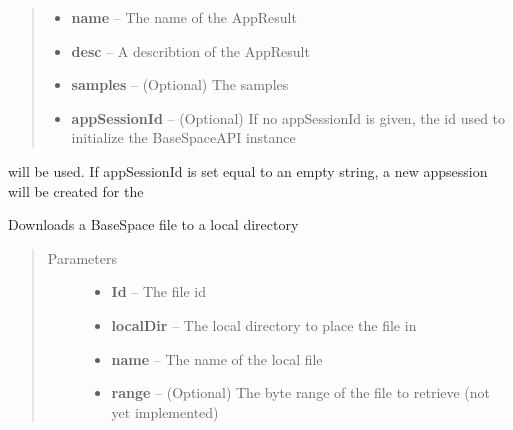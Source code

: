 \documentclass[letterpaper,10pt,english]{sphinxmanual}
\begin{document}
\begin{fulllineitems}
\begin{fulllineitems}
\begin{quote}
\begin{description}
\begin{itemize}
\item {} 
\textbf{name} -- The name of the AppResult

\item {} 
\textbf{desc} -- A describtion of the AppResult

\item {} 
\textbf{samples} -- (Optional) The samples

\item {} 
\textbf{appSessionId} -- (Optional) If no appSessionId is given, the id used to initialize the BaseSpaceAPI instance

\end{itemize}

\end{description}\end{quote}

will be used. If appSessionId is set equal to an empty string, a new appsession will be created for the

\end{fulllineitems}


\begin{fulllineitems}
\label{Available modules:BaseSpacePy.api.BaseSpaceAPI.BaseSpaceAPI.fileDownload}
Downloads a BaseSpace file to a local directory
\begin{quote}\begin{description}
\item[{Parameters}] \leavevmode\begin{itemize}
\item {} 
\textbf{Id} -- The file id

\item {} 
\textbf{localDir} -- The local directory to place the file in

\item {} 
\textbf{name} -- The name of the local file

\item {} 
\textbf{range} -- (Optional) The byte range of the file to retrieve (not yet implemented)

\end{itemize}

\end{description}\end{quote}


\end{fulllineitems}
\end{fulllineitems}
\end{document}
